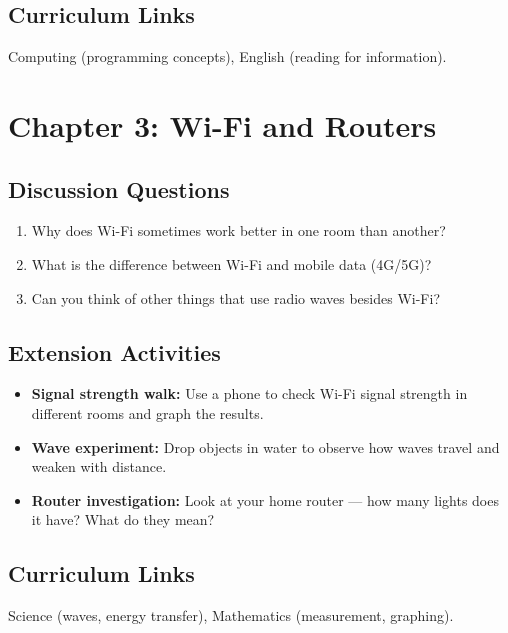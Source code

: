 \subsection*{Curriculum Links}
Computing (programming concepts), English (reading for information).

\sectionrule

\section*{Chapter 3: Wi-Fi and Routers}

\subsection*{Discussion Questions}
\begin{enumerate}
  \item Why does Wi-Fi sometimes work better in one room than another?
  \item What is the difference between Wi-Fi and mobile data (4G/5G)?
  \item Can you think of other things that use radio waves besides Wi-Fi?
\end{enumerate}

\subsection*{Extension Activities}
\begin{itemize}
  \item \textbf{Signal strength walk:} Use a phone to check Wi-Fi signal strength in different rooms and graph the results.
  \item \textbf{Wave experiment:} Drop objects in water to observe how waves travel and weaken with distance.
  \item \textbf{Router investigation:} Look at your home router — how many lights does it have? What do they mean?
\end{itemize}

\subsection*{Curriculum Links}
Science (waves, energy transfer), Mathematics (measurement, graphing).

\sectionrule

